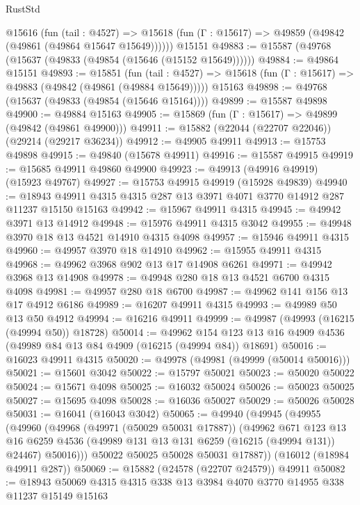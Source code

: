 \begin{lexlean}{RustStd}
\begin{coremodule}
    @15616
      (fun (tail : @4527) =>
      @15618 (fun (Γ : @15617) => @49859 (@49842 (@49861 (@49864 @15647 @15649))))))
    @15151
@49883 := @15587 (@49768 (@15637 (@49833 (@49854 (@15646 (@15152 @15649))))))
@49884 := @49864 @15151
@49893 := @15851
    (fun (tail : @4527) => @15618 (fun (Γ : @15617) => @49883 (@49842 (@49861 (@49884 @15649)))))
    @15163
@49898 := @49768 (@15637 (@49833 (@49854 (@15646 @15164))))
@49899 := @15587 @49898
@49900 := @49884 @15163
@49905 := @15869 (fun (Γ : @15617) => @49899 (@49842 (@49861 @49900)))
@49911 := @15882 (@22044 (@22707 @22046)) (@29214 (@29217 @36234))
@49912 := @49905 @49911
@49913 := @15753 @49898
@49915 := @49840 (@15678 @49911)
@49916 := @15587 @49915
@49919 := @15685 @49911 @49860 @49900
@49923 := @49913 (@49916 @49919) (@15923 @49767)
@49927 := @15753 @49915 @49919 (@15928 @49839)
@49940 := @18943 @49911 @4315 @4315 @287 @13 @3971 @4071 @3770 @14912 @287 @11237 @15150 @15163
@49942 := @15967 @49911 @4315
@49945 := @49942 @3971 @13 @14912
@49948 := @15976 @49911 @4315 @3042
@49955 := @49948 @3970 @18 @13 @4521 @14910 @4315 @4098
@49957 := @15946 @49911 @4315
@49960 := @49957 @3970 @18 @14910
@49962 := @15955 @49911 @4315
@49968 := @49962 @3968 @902 @13 @17 @14908 @6261
@49971 := @49942 @3968 @13 @14908
@49978 := @49948 @280 @18 @13 @4521 @6700 @4315 @4098
@49981 := @49957 @280 @18 @6700
@49987 := @49962 @141 @156 @13 @17 @4912 @6186
@49989 := @16207 @49911 @4315
@49993 := @49989 @50 @13 @50 @4912
@49994 := @16216 @49911
@49999 := @49987 (@49993 (@16215 (@49994 @50)) @18728)
@50014 := @49962
    @154
    @123
    @13
    @16
    @4909
    @4536
    (@49989 @84 @13 @84 @4909 (@16215 (@49994 @84)) @18691)
@50016 := @16023 @49911 @4315
@50020 := @49978 (@49981 (@49999 (@50014 @50016)))
@50021 := @15601 @3042
@50022 := @15797 @50021
@50023 := @50020 @50022
@50024 := @15671 @4098
@50025 := @16032 @50024
@50026 := @50023 @50025
@50027 := @15695 @4098
@50028 := @16036 @50027
@50029 := @50026 @50028
@50031 := @16041 (@16043 @3042)
@50065 := @49940
    (@49945
      (@49955
        (@49960
          (@49968
            (@49971 (@50029 @50031 @17887))
            (@49962
              @671
              @123
              @13
              @16
              @6259
              @4536
              (@49989 @131 @13 @131 @6259 (@16215 (@49994 @131)) @24467)
              @50016)))
        @50022
        @50025
        @50028
        @50031
        @17887))
    (@16012 (@18984 @49911 @287))
@50069 := @15882 (@24578 (@22707 @24579)) @49911
@50082 := @18943 @50069 @4315 @4315 @338 @13 @3984 @4070 @3770 @14955 @338 @11237 @15149 @15163

\end{coremodule}
\end{lexlean}
